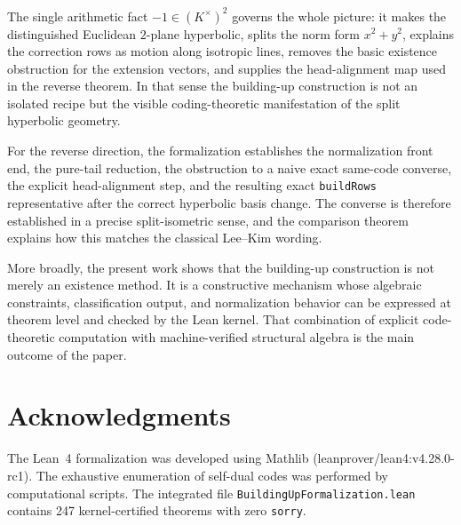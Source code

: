 \documentclass[12pt]{article}
\begin{document}
The single arithmetic fact $-1\in (K^\times)^2$ governs the whole picture: it makes the distinguished Euclidean $2$-plane hyperbolic, splits the norm form $x^2+y^2$, explains the correction rows as motion along isotropic lines, removes the basic existence obstruction for the extension vectors, and supplies the head-alignment map used in the reverse theorem. In that sense the building-up construction is not an isolated recipe but the visible coding-theoretic manifestation of the split hyperbolic geometry.

For the reverse direction, the formalization establishes the normalization front end, the pure-tail reduction, the obstruction to a naive exact same-code converse, the explicit head-alignment step, and the resulting exact \texttt{buildRows} representative after the correct hyperbolic basis change. The converse is therefore established in a precise split-isometric sense, and the comparison theorem explains how this matches the classical Lee--Kim wording.

More broadly, the present work shows that the building-up construction is not merely an existence method. It is a constructive mechanism whose algebraic constraints, classification output, and normalization behavior can be expressed at theorem level and checked by the Lean kernel. That combination of explicit code-theoretic computation with machine-verified structural algebra is the main outcome of the paper.


\section*{Acknowledgments}

The Lean~4 formalization was developed using Mathlib (leanprover/lean4:v4.28.0-rc1). The exhaustive enumeration of self-dual codes was performed by computational scripts. The integrated file \texttt{BuildingUpFormalization.lean} contains 247 kernel-certified theorems with zero \texttt{sorry}.
\end{document}
